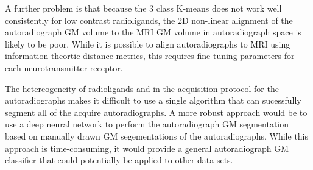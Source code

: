\documentclass[12pt]{article}
\begin{document}
A further problem is that because the 3 class K-means does not work well consistently for low contrast radioligands, the 2D non-linear alignment of the autoradiograph GM volume to the MRI GM volume in autoradiograph space is likely to be poor. While it is possible to align autoradiographs to MRI using information theortic distance metrics, this requires fine-tuning parameters for each neurotransmitter receptor. 

The hetereogeneity of radioligands and in the acquisition protocol for the autoradiographs makes it difficult to use a single algorithm that can sucessfully segment all of the acquire autoradiographs. A more robust approach would be to use a deep neural network to perform the autoradiograph GM segmentation based on manually drawn GM segementations of the autoradiographs. While this approach is time-consuming, it would provide a general autoradiograph GM classifier that could potentially be applied to other data sets. 






\end{document}
